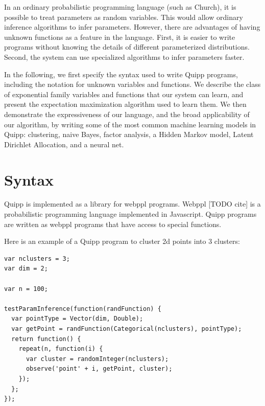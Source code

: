 \documentclass{article}
\begin{document}

  In an ordinary probabilistic programming language (such as Church),
  it is possible to treat parameters as random variables.  This
  would allow ordinary inference algorithms to infer parameters.  However,
  there are advantages of having unknown functions as a feature
  in the language.
  First, it is easier to
  write programs without knowing the details of different parameterized distributions.
  Second, the system can use specialized algorithms to infer parameters faster.



  In the following, we first specify the syntax used to write Quipp programs,
  including the notation for unknown variables and functions.
  We describe the class of exponential family variables and functions that our system can learn,
  and present the expectation maximization algorithm used to learn them.
  We then demonstrate the expressiveness of our language, and the broad
  applicability of our algorithm, by writing some of the most common machine learning models
  in Quipp: clustering, naive Bayes, factor analysis, a Hidden Markov model, Latent Dirichlet Allocation, and
  a neural net.
  
  \section{Syntax}

  Quipp is implemented as a library for webppl programs.  Webppl [TODO cite] is a probabilistic programming language
  implemented in Javascript. Quipp programs are written as webppl programs that have access to special functions.

  Here is an example of a Quipp program to cluster 2d points into 3 clusters:
  \begin{verbatim}
var nclusters = 3;
var dim = 2;

var n = 100;

testParamInference(function(randFunction) {
  var pointType = Vector(dim, Double);
  var getPoint = randFunction(Categorical(nclusters), pointType);
  return function() {
    repeat(n, function(i) {
      var cluster = randomInteger(nclusters);
      observe('point' + i, getPoint, cluster);
    });
  };
});
  \end{verbatim}
\end{document}
